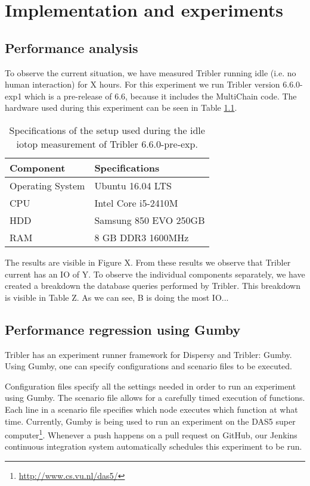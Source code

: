 \chapter{Implementation and experiments}
\label{implementation_and_experiments}

\section{Performance analysis}
To observe the current situation, we have measured Tribler running idle (i.e. no human interaction) for X hours. 
For this experiment we run Tribler version 6.6.0-exp1 which is a pre-release of 6.6, because it includes the MultiChain code.
The hardware used during this experiment can be seen in Table \ref{table:tribler_idle}.

\begin{table}[h]
	\centering
	\begin{tabular}{l|l}
		\textbf{Component} 	& \textbf{Specifications} \\ \hline
		Operating System   	& Ubuntu 16.04 LTS \\
		CPU					& Intel Core i5-2410M \\ 
		HDD					& Samsung 850 EVO 250GB  \\ 
		RAM					& 8 GB DDR3 1600MHz \\
	\end{tabular}
	\caption{Specifications of the setup used during the idle iotop measurement of Tribler 6.6.0-pre-exp.}
	\label{table:tribler_idle}
\end{table}

The results are visible in Figure X.
From these results we observe that Tribler current has an IO of Y.
To observe the individual components separately, we have created a breakdown the database queries performed by Tribler.
This breakdown is visible in Table Z.
As we can see, B is doing the most IO... 

\section{Performance regression using Gumby}

Tribler has an experiment runner framework for Dispersy and Tribler: Gumby.
Using Gumby, one can specify configurations and scenario files to be executed.

Configuration files specify all the settings needed in order to run an experiment using Gumby.
The scenario file allows for a carefully timed execution of functions.
Each line in a scenario file specifies which node executes which function at what time. 
Currently, Gumby is being used to run an experiment on the DAS5 super computer\footnote{\url{http://www.cs.vu.nl/das5/}}.
Whenever a push happens on a pull request on GitHub, our Jenkins continuous integration system automatically schedules this experiment to be run.

